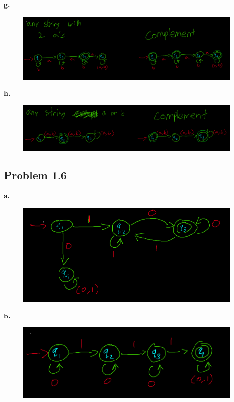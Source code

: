 \documentclass[letter]{article}
\theoremstyle{case}
\begin{document}
\textbf{g.}
\begin{figure}[h!]
	\includegraphics[scale=0.4]{5g.png}
\end{figure}

\textbf{h.}
\begin{figure}[h!]
	\includegraphics[scale=0.4]{5h.png}
\end{figure}

\newpage
\subsection*{Problem 1.6}
\textbf{a.}
\begin{figure}[h!]
	\includegraphics[scale=0.4]{6a.png}
\end{figure}

\textbf{b.}
\begin{figure}[h!]
	\includegraphics[scale=0.4]{6b.png}
\end{figure}
\end{document}
